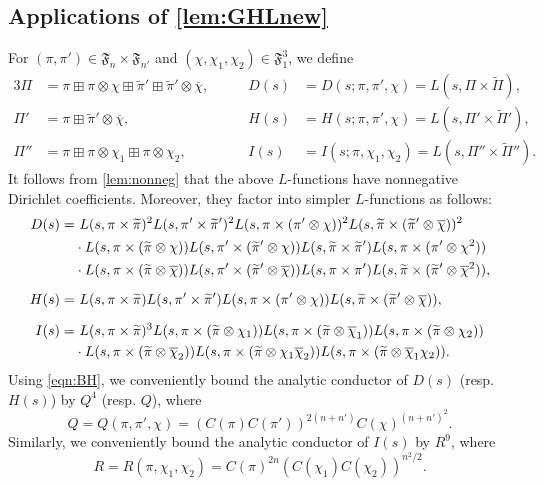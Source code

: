 \documentclass[12pt]{amsart}
\theoremstyle{definition}
\theoremstyle{remark}
\numberwithin{equation}{section}
\theoremstyle{plain}
\renewcommand{\tilde}{\widetilde}
\renewcommand{\bar}{\overline}
\begin{document}
\subsection{Applications of \cref{lem:GHLnew}}
For $(\pi,\pi')\in\mathfrak{F}_n\times\mathfrak{F}_{n'}$ and $(\chi,\chi_1,\chi_2)\in\mathfrak{F}_1^3$, we define
\begin{alignat}{3}
\label{eqn:Pi}
\Pi&=\pi\boxplus\pi\otimes\chi\boxplus\tilde\pi'\boxplus\tilde\pi'\otimes\bar{\chi},\qquad& 
D(s)&=D(s;\pi,\pi',\chi)=L(s,\Pi\times\tilde{\Pi}),\\
\label{eqn:Pi2}
\Pi'&=\pi\boxplus\tilde\pi'\otimes\bar{\chi},& 
H(s)&=H(s;\pi,\pi',\chi)=L(s,\Pi'\times\tilde{\Pi}'),\\
\label{eqn:Pi3}
\Pi''&=\pi\boxplus \pi\otimes\chi_1\boxplus\pi\otimes\chi_2,& 
I(s)&=I(s;\pi,\chi_1,\chi_2)=L(s,\Pi''\times\tilde{\Pi}'').
\end{alignat}
It follows from \cref{lem:nonneg} that the above $L$-functions have nonnegative Dirichlet coefficients. Moreover, they factor into simpler $L$-functions as follows:
\begin{align}
D(s)=
\label{eqn:D_def}
&~L(s,\pi\times\tilde\pi)^2 L(s,\pi'\times\tilde\pi')^2 L(s,\pi\times(\pi'\otimes\chi))^2 L(s,\tilde\pi\times(\tilde\pi'\otimes\bar{\chi}))^2\\
\notag
&\cdot L(s,\pi\times(\tilde\pi\otimes\chi)) L(s,\pi'\times(\tilde\pi'\otimes\chi)) L(s,\tilde\pi\times\tilde\pi') L(s,\pi\times(\pi'\otimes\chi^2))\\
\notag
&\cdot L(s,\pi\times(\tilde\pi\otimes\bar{\chi})) L(s,\pi'\times(\tilde\pi'\otimes\bar{\chi})) L(s,\pi\times\pi') L(s,\tilde\pi\times(\tilde\pi'\otimes\bar{\chi}^2)),\\[6pt]
\label{eqn:D_def2}
H(s)=&~L(s,\pi\times\tilde\pi)L(s,\pi'\times\tilde\pi')L(s,\pi\times(\pi'\otimes\chi))L(s,\tilde\pi\times(\tilde\pi'\otimes\bar{\chi})),\\[6pt]
\label{eqn:D_def3}
I(s)=&~L(s,\pi\times\tilde{\pi})^3 L(s,\pi\times(\tilde{\pi}\otimes\chi_1))L(s,\pi\times(\tilde{\pi}\otimes\bar{\chi}_1))L(s,\pi\times(\tilde{\pi}\otimes\chi_2))\\
\notag
&\cdot L(s,\pi\times(\tilde{\pi}\otimes\bar{\chi}_2))L(s,\pi\times(\tilde{\pi}\otimes\chi_1\bar{\chi}_2))L(s,\pi\times(\tilde{\pi}\otimes\bar{\chi}_1 \chi_2)).
\end{align}
Using \eqref{eqn:BH}, we conveniently bound the analytic conductor of $D(s)$ (resp. $H(s)$) by $Q^4$ (resp. $Q$), where
\begin{equation}
\label{eqn:Rdef}
Q=Q(\pi,\pi',\chi)=(C(\pi)C(\pi'))^{2(n+n')}C(\chi)^{(n+n')^2}.
\end{equation}
Similarly, we conveniently bound the analytic conductor of $I(s)$ by $R^9$, where
\begin{equation}
\label{eqn:Rdef2}
R=R(\pi,\chi_1,\chi_2)=C(\pi)^{2n}(C(\chi_1)C(\chi_2))^{n^2/2}.
\end{equation}
\end{document}

